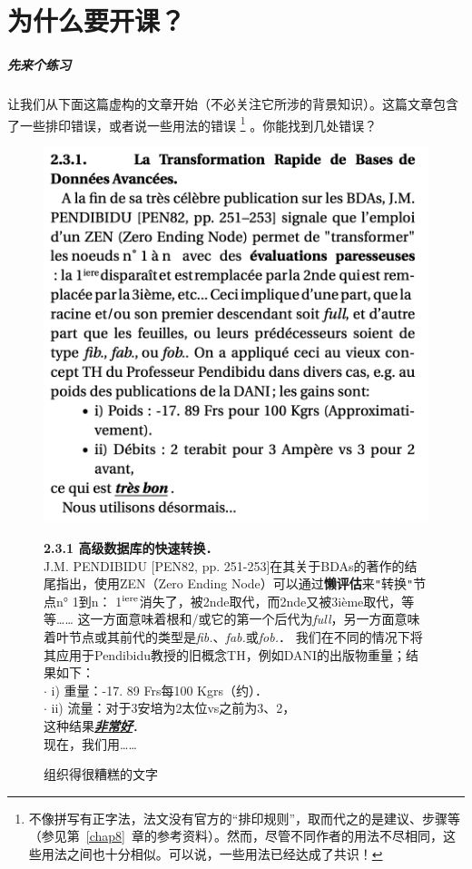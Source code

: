 \chapter{为什么要开课？}


\paragraph*{先来个练习}让我们从下面这篇虚构的文章开始（不必关注它所涉的背景知识）。这篇文章包含了一些排印错误，或者说一些用法的错误 
    \footnote{不像拼写有正字法，法文没有官方的``排印规则''，取而代之的是建议、步骤等（参见第~\ref{chap8}~章的参考资料）。然而，尽管不同作者的用法不尽相同，这些用法之间也十分相似。可以说，一些用法已经达成了共识！}
。你能找到几处错误？

\begin{figure}
    \centering
    \includegraphics[width = .75\linewidth]{img/1.png}

\begin{bil}
    \textbf{2.3.1 \quad 高级数据库的快速转换．}\\
    J.M. PENDIBIDU [PEN82, pp. 251-253]在其关于BDAs的著作的结尾指出，使用ZEN（Zero Ending Node）可以通过\textbf{懒评估}来\verb|"|转换\verb|"|节点n° 1到n：
    1$^{\rm iere}$消失了，被2nde取代，而2nde又被3ième取代，等等……
    这一方面意味着根和/或它的第一个后代为\emph{full}，另一方面意味着叶节点或其前代的类型是\emph{fib.}、\emph{fab.}或\emph{fob.}．
    我们在不同的情况下将其应用于Pendibidu教授的旧概念TH，例如DANI的出版物重量；结果如下：\\
    $\cdot$ i) 重量：-17. 89 Frs每100 Kgrs（约）．\\
    $\cdot$ ii) 流量：对于3安培为2太位vs之前为3、2，\\
    这种结果\textbf{\emph{\underline{非常好}}}．\\
    现在，我们用……
\end{bil}

    \caption{组织得很糟糕的文字}
    \label{fig1}
\end{figure}

